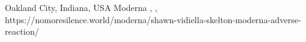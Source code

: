           {
            Oakland City, Indiana, USA
          }
          {
          }
          {
            Moderna
          }
          {
          }
          {
            ,
            ,
          }
          {
            https://nomoresilence.world/moderna/shawn-vidiella-skelton-moderna-adverse-reaction/
          }


